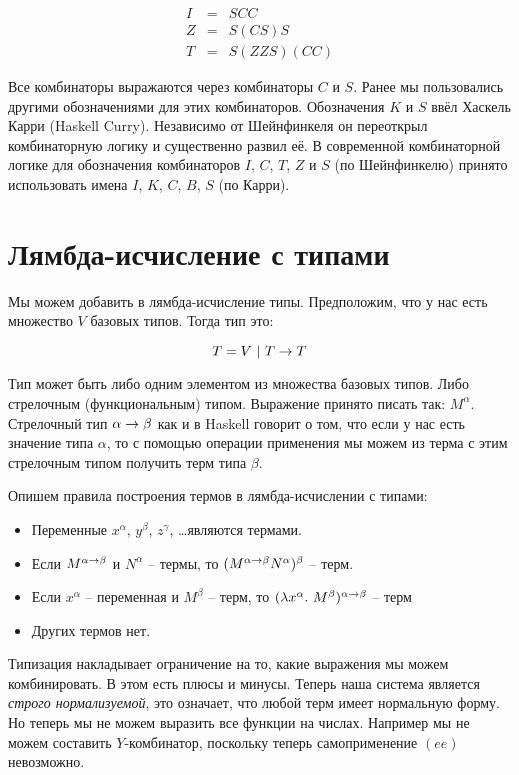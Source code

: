 \begin{eqnarray*}
I &=& SCC \\
Z &=& S(CS)S \\
T &=& S(ZZS)(CC)
\end{eqnarray*}

Все комбинаторы выражаются через комбинаторы $C$ и $S$. 
Ранее мы пользовались другими обозначениями для этих комбинаторов. 
Обозначения $K$ и $S$ ввёл Хаскель Карри (Haskell Curry). 
Независимо от Шейнфинкеля он переоткрыл комбинаторную логику
и существенно развил её.
В современной комбинаторной логике для обозначения
комбинаторов $I$, $C$, $T$, $Z$ и $S$ (по Шейнфинкелю) 
принято использовать имена $I$, $K$, $C$, $B$, $S$ (по Карри).

\section{Лямбда-исчисление с типами}

Мы можем добавить в лямбда-исчисление типы. 
Предположим, что у нас есть множество $V$ базовых типов.
Тогда тип это:

\[ T = V \ |\  T \rightarrow T \]

Тип может быть либо одним элементом из множества базовых типов.
Либо стрелочным (функциональным) типом. Выражение  принято писать так: $M^{\alpha}$. Стрелочный тип 
$\alpha \rightarrow \beta$ как и в Haskell говорит о том, что если у нас
есть значение типа $\alpha$, то с помощью операции применения 
мы можем из терма с этим стрелочным типом получить терм типа $\beta$.

Опишем правила построения термов в лямбда-исчислении с типами:

\begin{itemize}
\item Переменные $x^\alpha$, $y^\beta$, $z^\gamma$, \dots являются термами.
\item Если $M^{\alpha \rightarrow \beta}$ и $N^\alpha$ -- термы, то
        $(M^{\alpha \rightarrow \beta}N^\alpha)^\beta$ -- терм.
\item Если $x^\alpha$ -- переменная и $M^\beta$ -- терм, то
        $(\lambda x^\alpha .\  M^\beta)^{\alpha \rightarrow \beta}$ -- терм
\item Других термов нет.
\end{itemize}

Типизация накладывает ограничение на то, какие выражения
мы можем комбинировать. В этом есть плюсы и минусы. 
Теперь наша система является \emph{строго нормализуемой},
это означает, что любой терм имеет нормальную форму. Но
теперь мы не можем выразить все функции на числах. 
Например мы не можем составить $Y$-комбинатор,
поскольку теперь самоприменение $(e e)$  невозможно.

